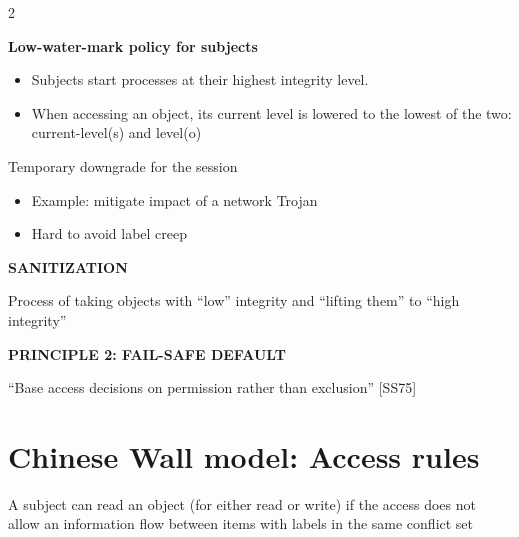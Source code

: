 \documentclass[a4paper,9pt]{extarticle}
\begin{document}
\begin{multicols}{2}
\begin{important}
\end{important}


\textbf{Low-water-mark policy for subjects}

\begin{itemize}

\item Subjects start processes at their highest integrity level.

\item When accessing an object, its current level is lowered to
the lowest of the two: current-level(s) and level(o)

\end{itemize}

Temporary downgrade for the session

\begin{itemize}

\item Example: mitigate impact of a network Trojan

\item Hard to avoid label creep

\end{itemize}


\begin{definition}

\textbf{SANITIZATION}

Process of taking objects with ``low'' integrity and ``lifting them'' to ``high integrity''

\end{definition}


\begin{important}

\textbf{PRINCIPLE 2: FAIL-SAFE DEFAULT}

``Base access decisions on permission rather than exclusion'' [SS75]

\end{important}



\section{Chinese Wall model: Access rules}


\begin{important}

A subject can read an object (for either read or write) if the access does not
allow an information flow between items with labels in the same conflict set

\end{important}



\end{multicols}
\end{document}
